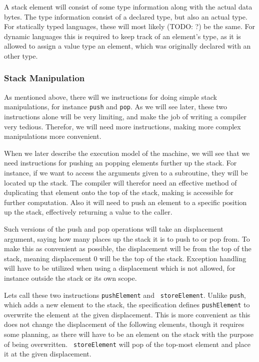 A stack element will consist of some type information along with the actual data
bytes. The type information consist of a declared type, but also an actual
type. For statically typed languages, these will most likely (TODO: ?) be the
same. For dynamic languages this is required to keep track of an element's type,
as it is allowed to assign a value type an element, which was originally
declared with an other type.

\subsubsection{Stack Manipulation}
As mentioned above, there will we instructions for doing simple stack
manipulations, for instance {\tt push} and {\tt pop}. As we will see later,
these two instructions alone will be very limiting, and make the job of writing
a compiler very tedious. Therefor, we will need more instructions, making more
complex manipulations more convenient.

When we later describe the execution model of the machine, we will see that we
need instructions for pushing an popping elements further up the stack. For
instance, if we want to access the arguments given to a subroutine, they will be
located up the stack. The compiler will therefor need an effective method of
duplicating that element onto the top of the stack, making is accessible for
further computation. Also it will need to push an element to a specific position
up the stack, effectively returning a value to the caller.

Such versions of the push and pop operations will take an displacement argument,
saying how many places up the stack it is to push to or pop from. To make this
as convenient as possible, the displacement will be from the top of the stack,
meaning displacement 0 will be the top of the stack. Exception handling will
have to be utilized when using a displacement which is not allowed, for instance
outside the stack or its own scope.

Lets call these two instructions {\tt pushElement} and {\tt
  storeElement}. Unlike {\tt push}, which adds a new element to the stack, the
specification defines {\tt pushElement} to overwrite the element at the given
displacement. This is more convenient as this does not change the displacement
of the following elements, though it requires some planning, as there will have
to be an element on the stack with the purpose of being overwritten. {\tt
  storeElement} will pop of the top-most element and place it at the given
displacement.

